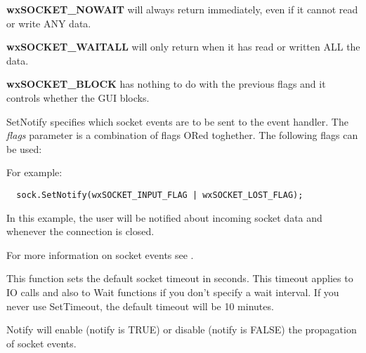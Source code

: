 {\bf wxSOCKET\_NOWAIT} will always return immediately, even if it cannot
read or write ANY data.

{\bf wxSOCKET\_WAITALL} will only return when it has read or written ALL
the data.

{\bf wxSOCKET\_BLOCK} has nothing to do with the previous flags and
it controls whether the GUI blocks.

%
%
\label{wxsocketbasesetnotify}


SetNotify specifies which socket events are to be sent to the event handler.
The {\it flags} parameter is a combination of flags ORed toghether. The
following flags can be used:

\twocolwidtha{7cm}
\begin{twocollist}\itemsep=0pt
\end{twocollist}%

For example:

\begin{verbatim}
  sock.SetNotify(wxSOCKET_INPUT_FLAG | wxSOCKET_LOST_FLAG);
\end{verbatim}

In this example, the user will be notified about incoming socket data and
whenever the connection is closed.

For more information on socket events see .

%
%
\label{wxsocketbasesettimeout}


This function sets the default socket timeout in seconds. This
timeout applies to IO calls and also to Wait functions if you
don't specify a wait interval. If you never use SetTimeout, the
default timeout will be 10 minutes.

%
%
\label{wxsocketbasenotify}


Notify will enable (notify is TRUE) or disable (notify is FALSE) the propagation
of socket events.

